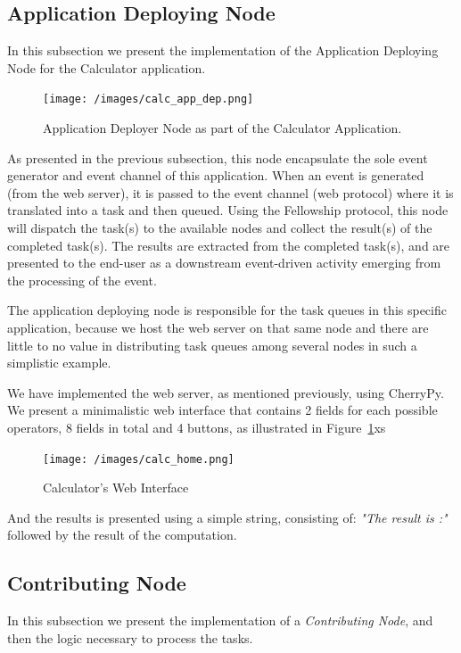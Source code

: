 \documentclass[12pt, titlepage]{uo_temp}
\begin{document}
     \subsection{Application Deploying Node}\label{impl_calc_appd}
     In this subsection we present the implementation of the Application Deploying Node
     for the Calculator application.
  
     \begin{figure}[h]
       \texttt{[image: /images/calc\_app\_dep.png]}
       \caption{Application Deployer Node as part of the Calculator Application.}
     \end{figure}
     As presented in the previous subsection, this node encapsulate the sole event
     generator and event channel of this application. When an event is generated (from the
     web server), it is passed to the event channel (web protocol) where it is translated
     into a task and then queued. Using the Fellowship protocol, this node will dispatch
     the task(s) to the available nodes and collect the result(s) of the completed
     task(s). The results are extracted from the completed task(s), and are presented to
     the end-user as a downstream event-driven activity emerging from the processing of
     the event.
     
     The application deploying node is responsible for the task queues in this specific
     application, because we host the web server on that same node and there are little to
     no value in distributing task queues among several nodes in such a simplistic example.  

     We have implemented the web server, as mentioned previously, using CherryPy. We present a
     minimalistic web interface that contains 2 fields for each possible operators, 8
     fields in total and 4 buttons, as illustrated in Figure~\ref{calc_home}xs
     \begin{figure}[h]
       \texttt{[image: /images/calc\_home.png]}
       \caption{Calculator's Web Interface}\label{calc_home}
     \end{figure}
     
     And the results is presented using a simple string, consisting of: \emph{"The result
       is :"} followed by the result of the computation. 
  
     \subsection{Contributing Node}
     In this subsection we present the implementation of a \emph{Contributing Node}, and then 
     the logic necessary to process the tasks.
\end{document}
